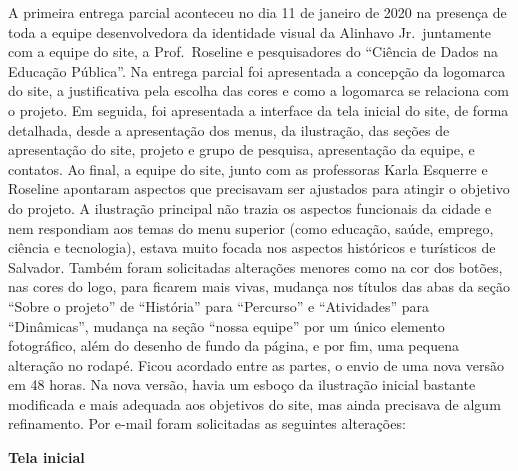 \documentclass[
]{book}
\begin{document}
A primeira entrega parcial aconteceu no dia 11 de janeiro de 2020 na presença de toda a equipe desenvolvedora da identidade visual da Alinhavo Jr.~juntamente com a equipe do site, a Prof.~Roseline e pesquisadores do ``Ciência de Dados na Educação Pública''. Na entrega parcial foi apresentada a concepção da logomarca do site, a justificativa pela escolha das cores e como a logomarca se relaciona com o projeto. Em seguida, foi apresentada a interface da tela inicial do site, de forma detalhada, desde a apresentação dos menus, da ilustração, das seções de apresentação do site, projeto e grupo de pesquisa, apresentação da equipe, e contatos. Ao final, a equipe do site, junto com as professoras Karla Esquerre e Roseline apontaram aspectos que precisavam ser ajustados para atingir o objetivo do projeto. A ilustração principal não trazia os aspectos funcionais da cidade e nem respondiam aos temas do menu superior (como educação, saúde, emprego, ciência e tecnologia), estava muito focada nos aspectos históricos e turísticos de Salvador. Também foram solicitadas alterações menores como na cor dos botões, nas cores do logo, para ficarem mais vivas, mudança nos títulos das abas da seção ``Sobre o projeto'' de ``História'' para ``Percurso'' e ``Atividades'' para ``Dinâmicas'', mudança na seção ``nossa equipe'' por um único elemento fotográfico, além do desenho de fundo da página, e por fim, uma pequena alteração no rodapé. Ficou acordado entre as partes, o envio de uma nova versão em 48 horas.
Na nova versão, havia um esboço da ilustração inicial bastante modificada e mais adequada aos objetivos do site, mas ainda precisava de algum refinamento. Por e-mail foram solicitadas as seguintes alterações:

\textbf{Tela inicial}
\end{document}

